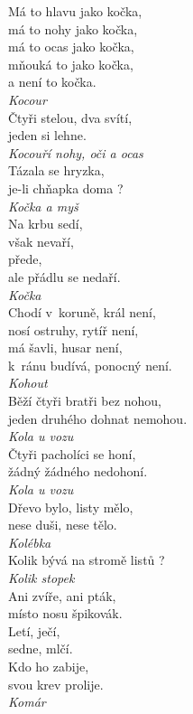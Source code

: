 \begin{multicols}{3}
\noindent
Má to hlavu jako kočka,\\
má to nohy jako kočka,\\
má to ocas jako kočka,\\
mňouká to jako kočka,\\
a není to kočka.\\[1 mm]
{\sl Kocour}\\

\noindent
Čtyři stelou, dva svítí,\\
jeden si lehne.\\[1 mm]
{\sl Kocouří nohy, oči a ocas}\\

\noindent
Tázala se hryzka,\\
je-li chňapka doma ?\\[1 mm]
{\sl Kočka a myš}\\

\noindent
Na krbu sedí,\\
však nevaří,\\
přede,\\
ale přádlu se nedaří.\\[1 mm]
{\sl Kočka}\\

\noindent
Chodí v~koruně, král není,\\
nosí ostruhy, rytíř není,\\
má šavli, husar není,\\
k~ránu budívá, ponocný není.\\[1 mm]
{\sl Kohout}\\

\noindent
Běží čtyři bratři bez nohou,\\
jeden druhého dohnat nemohou.\\[1 mm]
{\sl Kola u vozu}\\

\noindent
Čtyři pacholíci se honí,\\
žádný žádného nedohoní.\\[1 mm]
{\sl Kola u vozu}\\

\noindent
Dřevo bylo, listy mělo,\\
nese duši, nese tělo.\\[1 mm]
{\sl Kolébka}\\

\noindent
Kolik bývá na stromě listů ?\\[1 mm]
{\sl Kolik stopek}\\

\noindent
Ani zvíře, ani pták,\\
místo nosu špikovák.\\
Letí, ječí,\\
sedne, mlčí.\\
Kdo ho zabije,\\
svou krev prolije.\\[1 mm]
{\sl Komár}\\


\end{multicols}
